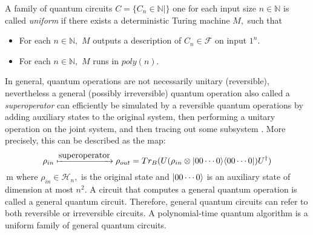 A family of quantum circuits $C=\{C_n\in \mathbb{N} \mid \}$   one for each input  size $n\in \mathbb{N}$ is called \emph{uniform} if there exists a deterministic Turing machine $M,$ such that
 \begin{itemize}
 \item For each $n\in\mathbb{N},$ $M$ outputs a description of $C_n \in \mathcal{F}$ on input $1^n.$
 \item  For each $n\in\mathbb{N},$ $M$ runs in $poly(n).$
 \end{itemize}

In general, quantum operations are not necessarily unitary (reversible), nevertheless a general (possibly irreversible) quantum operation also called a \emph{superoperator} can efficiently be simulated by a reversible quantum operations by adding auxiliary states to the original system, then performing a unitary operation on the joint system, and then tracing out %
some subsystem \cite{KLM07}. More precisely, this can be described as the map:
$$\rho_{in} \xmapsto{\mbox{superoperator}} \rho_{out}=Tr_B(U(\rho_{in} \otimes {\lvert}00\cdots 0\rangle {\langle}00\cdots 0\rvert)U^\dagger)$$\,m
where $\rho_{in} \in \mathcal{H}_n,$ is the original state and ${\lvert}00\cdots 0\rangle$ is an auxiliary state of dimension at most $n^2.$ A circuit that computes a general quantum operation is called a general quantum circuit.  Therefore, general quantum circuits can refer to both reversible or irreversible circuits. A polynomial-time quantum algorithm is a uniform family of general quantum circuits. 





